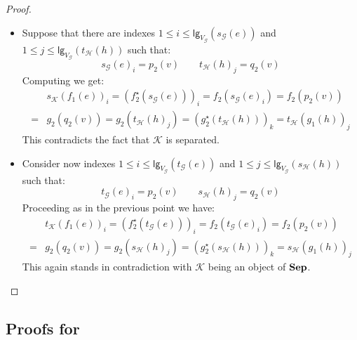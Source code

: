 \documentclass[3p]{elsarticle}
\newcommand{\lgh}{\mathsf{lg}}
\newcommand{\catname}[1]{\textbf{\textup{#1}}}
\newcommand{\shyp}{\catname{Sep}}
\theoremstyle{remark}
\theoremstyle{definition}
\begin{document}
\begin{proof}
\begin{itemize}
 		
		\item Suppose that there are indexes $1\leq i\leq \lgh_{V_{\mathcal{G}}}(s_{\mathcal{G}}(e))$ and $1\leq j\leq \lgh_{V_{\mathcal{G}}}(t_{\mathcal{H}}(h))$ such that:
		\[s_{\mathcal{G}}(e)_i = p_2(v) \qquad t_{\mathcal{H}}(h)_j = q_2(v)\]
		Computing we get:
			\begin{align*}
			&s_{\mathcal{K}}(f_1(e))_i=(f^\star_2(s_{\mathcal{G}}(e)))_i=f_2(s_{\mathcal{G}}(e)_i)=f_2(p_2(v))\\=&g_2(q_2(v))=g_2(t_{\mathcal{H}}(h)_j)=(g^\star_2(t_{\mathcal{H}}(h)))_k=t_{\mathcal{H}}(g_1(h))_j
		\end{align*}
		This contradicts the fact that $\mathcal{K}$ is separated.
		\item Consider now indexes $1\leq i\leq \lgh_{V_{\mathcal{G}}}(t_{\mathcal{G}}(e))$ and $1\leq j\leq \lgh_{V_{\mathcal{G}}}(s_{\mathcal{H}}(h))$ such that:
		\[t_{\mathcal{G}}(e)_i = p_2(v) \qquad s_{\mathcal{H}}(h)_j = q_2(v)\] 
		Proceeding as in the previous point we have:
				\begin{align*}
			&t_{\mathcal{K}}(f_1(e))_i=(f^\star_2(t_{\mathcal{G}}(e)))_i=f_2(t_{\mathcal{G}}(e)_i)=f_2(p_2(v))\\=&g_2(q_2(v))=g_2(s_{\mathcal{H}}(h)_j)=(g^\star_2(s_{\mathcal{H}}(h)))_k=s_{\mathcal{H}}(g_1(h))_j
		\end{align*}
		This again stands in contradiction with $\mathcal{K}$ being an object of $\shyp$. \qedhere
	\end{itemize}
\end{proof}

\subsection{Proofs for }\label{app:due}
\fhyp*
\end{document}
